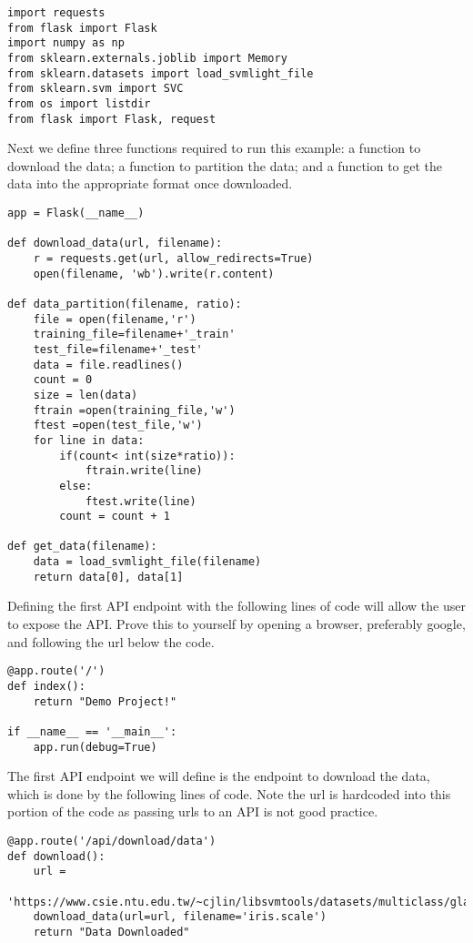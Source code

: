 \begin{lstlisting}
import requests
from flask import Flask
import numpy as np
from sklearn.externals.joblib import Memory
from sklearn.datasets import load_svmlight_file
from sklearn.svm import SVC
from os import listdir
from flask import Flask, request
\end{lstlisting} 

Next we define three functions required to run this example: a
function to download the data; a function to partition the data; and a
function to get the data into the appropriate format once downloaded. 

\begin{lstlisting}
app = Flask(__name__)

def download_data(url, filename):
    r = requests.get(url, allow_redirects=True)
    open(filename, 'wb').write(r.content)

def data_partition(filename, ratio):
    file = open(filename,'r')
    training_file=filename+'_train'
    test_file=filename+'_test'
    data = file.readlines()
    count = 0
    size = len(data)
    ftrain =open(training_file,'w')
    ftest =open(test_file,'w')
    for line in data:
        if(count< int(size*ratio)):
            ftrain.write(line)
        else:
            ftest.write(line)
        count = count + 1        

def get_data(filename):
    data = load_svmlight_file(filename)
    return data[0], data[1]
\end{lstlisting} 

Defining the first API endpoint with the following lines of code will
allow the user to expose the API. Prove this to yourself by opening a
browser, preferably google, and following the url below the code.

\begin{lstlisting}
@app.route('/')
def index():
    return "Demo Project!"

if __name__ == '__main__':
    app.run(debug=True)
\end{lstlisting} 


The first API endpoint we will define is the endpoint to download the
data, which is done by the following lines of code. Note the url is
hardcoded into this portion of the code as passing urls to an API is
not good practice.  

\begin{lstlisting}
@app.route('/api/download/data')
def download():
    url =
    'https://www.csie.ntu.edu.tw/~cjlin/libsvmtools/datasets/multiclass/glass.scale'
    download_data(url=url, filename='iris.scale')
    return "Data Downloaded"
\end{lstlisting} 

